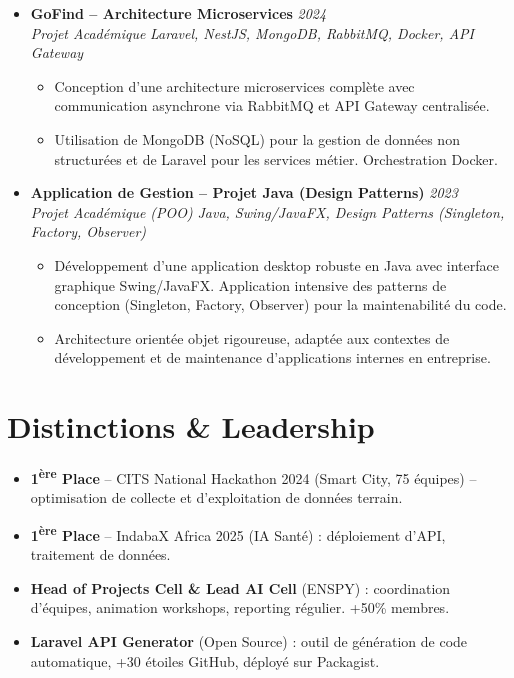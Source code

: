 \documentclass[a4paper,11pt]{article}
\begin{document}
\begin{itemize}[leftmargin=*, label={-}]
\item \textbf{GoFind -- Architecture Microservices} \hfill \textit{2024} \\
\textit{Projet Académique} \hfill \textit{Laravel, NestJS, MongoDB, RabbitMQ, Docker, API Gateway}
\vspace{-2pt}
    \begin{itemize}[leftmargin=0.4cm, nosep, label=\tiny$\bullet$]
        \item \small{Conception d'une architecture microservices complète avec communication asynchrone via RabbitMQ et API Gateway centralisée.}
        \item \small{Utilisation de MongoDB (NoSQL) pour la gestion de données non structurées et de Laravel pour les services métier. Orchestration Docker.}
    \end{itemize}
\vspace{3pt}

\item \textbf{Application de Gestion -- Projet Java (Design Patterns)} \hfill \textit{2023} \\
\textit{Projet Académique (POO)} \hfill \textit{Java, Swing/JavaFX, Design Patterns (Singleton, Factory, Observer)}
\vspace{-2pt}
    \begin{itemize}[leftmargin=0.4cm, nosep, label=\tiny$\bullet$]
        \item \small{Développement d'une application desktop robuste en Java avec interface graphique Swing/JavaFX. Application intensive des patterns de conception (Singleton, Factory, Observer) pour la maintenabilité du code.}
        \item \small{Architecture orientée objet rigoureuse, adaptée aux contextes de développement et de maintenance d'applications internes en entreprise.}
    \end{itemize}
\vspace{3pt}

\end{itemize}

\section{Distinctions \& Leadership}
\begin{itemize}[leftmargin=*, nosep, label=\tiny$\bullet$]
    \item \small{\textbf{1\textsuperscript{ère} Place} -- CITS National Hackathon 2024 (Smart City, 75 équipes) -- optimisation de collecte et d'exploitation de données terrain.}
    \item \small{\textbf{1\textsuperscript{ère} Place} -- IndabaX Africa 2025 (IA Santé) : déploiement d'API, traitement de données.}
    \item \small{\textbf{Head of Projects Cell \& Lead AI Cell} (ENSPY) : coordination d'équipes, animation workshops, reporting régulier. +50\% membres.}
    \item \small{\textbf{Laravel API Generator} (Open Source) : outil de génération de code automatique, +30 étoiles GitHub, déployé sur Packagist.}
\end{itemize}
\end{document}
